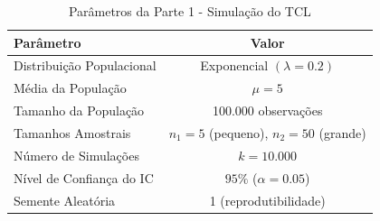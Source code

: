 \begin{table}[H]
\centering
\begin{tabular}{|l|c|}
\hline
\textbf{Parâmetro} & \textbf{Valor} \\
\hline
Distribuição Populacional & Exponencial $(\lambda = 0.2)$ \\
Média da População & $\mu = 5$ \\
Tamanho da População & 100.000 observações \\
Tamanhos Amostrais & $n_1 = 5$ (pequeno), $n_2 = 50$ (grande) \\
Número de Simulações & $k = 10.000$ \\
Nível de Confiança do IC & $95\%$ ($\alpha = 0.05$) \\
Semente Aleatória & 1 (reprodutibilidade) \\
\hline
\end{tabular}
\caption{Parâmetros da Parte 1 - Simulação do TCL}
\label{tab:param_parte1}
\end{table}
